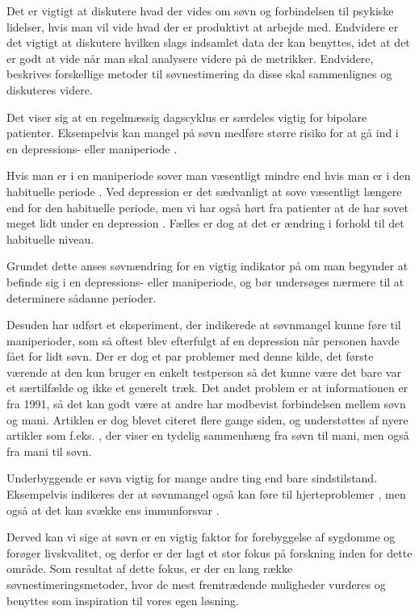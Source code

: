 Det er vigtigt at diskutere hvad der vides om søvn og forbindelsen til psykiske lidelser, hvis man vil vide hvad der er produktivt at arbejde med.
Endvidere er det vigtigt at diskutere hvilken slags indsamlet data der kan benyttes, idet at det er godt at vide når man skal analysere videre på de metrikker.
Endvidere, beskrives forskellige metoder til søvnestimering da disse skal sammenlignes og diskuteres videre.

Det viser sig at en regelmæssig dagscyklus er særdeles vigtig for bipolare patienter.
Eksempelvis kan mangel på søvn medføre større risiko for at gå ind i en depressions- eller maniperiode \citep{CPSP:CPSP1164}.

Hvis man er i en maniperiode sover man væsentligt mindre end hvis man er i den habituelle periode \citep{CPSP:CPSP1164}.
Ved depression er det sædvanligt at sove væsentligt længere end for den habituelle periode, men vi har også hørt fra patienter at de har sovet meget lidt under en depression \citep[Kapitel 2, Sektion 5]{misc:faellesrapp}. Fælles er dog at det er ændring i forhold til det habituelle niveau.

Grundet dette anses søvnændring for en vigtig indikator på om man begynder at befinde sig i en depressions- eller maniperiode, og bør undersøges nærmere til at determinere sådanne perioder.

Desuden har \citet{art:sleepCusMania} udført et eksperiment, der indikerede at søvnmangel kunne føre til maniperioder, som så oftest blev efterfulgt af en depression når personen havde fået for lidt søvn.
Der er dog et par problemer med denne kilde, det første værende at den kun bruger en enkelt testperson så det kunne være det bare var et særtilfælde og ikke et generelt træk.
Det andet problem er at informationen er fra 1991, så det kan godt være at andre har modbevist forbindelsen mellem søvn og mani.
Artiklen er dog blevet citeret flere gange siden, og understøttes af nyere artikler som f.eks. \citet{barbini1996sleep}, der viser en tydelig sammenhæng fra søvn til mani, men også fra mani til søvn.

Underbyggende er søvn vigtig for mange andre ting end bare sindstilstand.
Eksempelvis indikeres der at søvnmangel også kan føre til hjerteproblemer \citep{Mullington2009294,art:sleeplossHeart}, men også at det kan svække ens immunforsvar \citep{misc:sleepImmune}.

Derved kan vi sige at søvn er en vigtig faktor for forebyggelse af sygdomme og forøger livskvalitet, og derfor er der lagt et stor fokus på forskning inden for dette område.
Som resultat af dette fokus, er der en lang række søvnestimeringsmetoder, hvor de mest fremtrædende muligheder vurderes og benyttes som inspiration til vores egen løsning.

